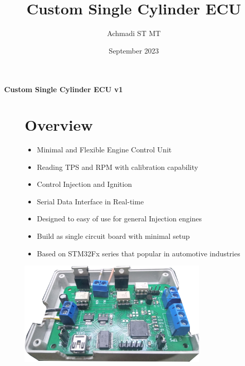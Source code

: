 \documentclass[a4paper,12pt,oneside,pdflatex,italian,final,twocolumn]{article}
\title{Custom Single Cylinder ECU}
\author{Achmadi ST MT}
\date{September 2023}
\begin{document}
	\pagestyle{fancy}

	\chead{\today}

	\onecolumn
	\begin{figure}

	\end{figure}\begin{minipage}{0.47\textwidth}
		\centering

	\end{minipage}
	\hfill
	\begin{minipage}{0.47\textwidth}
		\raggedleft
		\Huge \textbf{Custom Single Cylinder ECU v1}
	\end{minipage}

	\begin{figure}
		\begin{minipage}{0.47\textwidth}

			\section{Overview}
			\begin{itemize}
				\item Minimal and Flexible Engine Control Unit
				\item Reading TPS and RPM with calibration capability
				\item Control Injection and Ignition
				\item Serial Data Interface in Real-time
				\item Designed to easy of use for general Injection engines
				\item Build as single circuit board with minimal setup
				\item Based on STM32Fx series that popular in automotive industries
			\end{itemize}

		\end{minipage}
		\hfill
		\begin{minipage}{0.47\textwidth}
			\centering
			\includegraphics[width=0.8\textwidth,right]{images/unit.png}
		\end{minipage}
	\end{figure}
\end{document}
